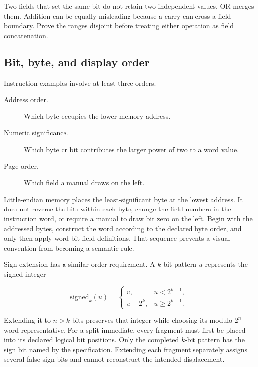 \begin{warning}[title={Bitwise OR is not a substitute for non-overlap}]
Two fields that set the same bit do not retain two independent values. OR
merges them. Addition can be equally misleading because a carry can cross a
field boundary. Prove the ranges disjoint before treating either operation as
field concatenation.
\end{warning}

\subsection{Bit, byte, and display order}

Instruction examples involve at least three orders.

\begin{description}
\item[Address order.] Which byte occupies the lower memory address.
\item[Numeric significance.] Which byte or bit contributes the larger power
of two to a word value.
\item[Page order.] Which field a manual draws on the left.
\end{description}

Little-endian memory places the least-significant byte at the lowest address.
It does not reverse the bits within each byte, change the field numbers in the
instruction word, or require a manual to draw bit zero on the left. Begin with
the addressed bytes, construct the word according to the declared byte order,
and only then apply word-bit field definitions. That sequence prevents a
visual convention from becoming a semantic rule.

Sign extension has a similar order requirement. A \(k\)-bit pattern \(u\)
represents the signed integer

\[
  \mathrm{signed}_k(u)=
  \left\{
  \begin{array}{ll}
    u, & u<2^{k-1},\\
    u-2^k, & u\ge 2^{k-1}.
  \end{array}
  \right.
\]

Extending it to \(n>k\) bits preserves that integer while choosing its
modulo-\(2^n\) word representative. For a split immediate, every fragment must
first be placed into its declared logical bit positions. Only the completed
\(k\)-bit pattern has the sign bit named by the specification. Extending each
fragment separately assigns several false sign bits and cannot reconstruct
the intended displacement.

